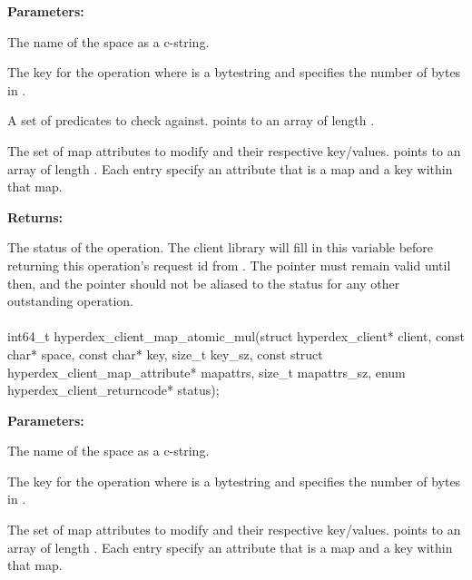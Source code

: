 \noindent\textbf{Parameters:}
\begin{description}[labelindent=\widthof{{\code{mapattrs}, \code{mapattrs\_sz}}},leftmargin=*,noitemsep,nolistsep,align=right]
\item[\code{space}] The name of the space as a c-string.
\item[\code{key}, \code{key\_sz}] The key for the operation where  is a bytestring and  specifies the number of bytes in .
\item[\code{checks}, \code{checks\_sz}] A set of predicates to check against.   points to an array of length .
\item[\code{mapattrs}, \code{mapattrs\_sz}] The set of map attributes to modify and their respective key/values.   points to an array of length .  Each entry specify an attribute that is a map and a key within that map.
\end{description}

\noindent\textbf{Returns:}
\begin{description}[labelindent=\widthof{{\code{status}}},leftmargin=*,noitemsep,nolistsep,align=right]
\item[\code{status}] The status of the operation.  The client library will fill in this variable before returning this operation's request id from .  The pointer must remain valid until then, and the pointer should not be aliased to the status for any other outstanding operation.
\end{description}

\paragraph{}
\label{api:c:map_atomic_mul}
\begin{ccode}
int64_t hyperdex_client_map_atomic_mul(struct hyperdex_client* client,
                const char* space,
                const char* key, size_t key_sz,
                const struct hyperdex_client_map_attribute* mapattrs, size_t mapattrs_sz,
                enum hyperdex_client_returncode* status);
\end{ccode}
\funcdesc 

\noindent\textbf{Parameters:}
\begin{description}[labelindent=\widthof{{\code{mapattrs}, \code{mapattrs\_sz}}},leftmargin=*,noitemsep,nolistsep,align=right]
\item[\code{space}] The name of the space as a c-string.
\item[\code{key}, \code{key\_sz}] The key for the operation where  is a bytestring and  specifies the number of bytes in .
\item[\code{mapattrs}, \code{mapattrs\_sz}] The set of map attributes to modify and their respective key/values.   points to an array of length .  Each entry specify an attribute that is a map and a key within that map.
\end{description}

